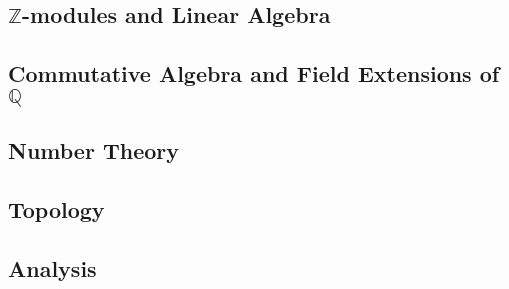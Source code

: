 \documentclass{article}
\newcommand{\nl}{\bigskip \\ } %
\newcommand{\Z}[0]{\mathbb{Z}}		%
\newcommand{\Q}[0]{\mathbb{Q}}		%
\theoremstyle{definition}
\theoremstyle{remark}
\begin{document}
\subsection{$\Z$-modules and Linear Algebra}
\subsection{Commutative Algebra and Field Extensions of $\Q$}
\subsection{Number Theory}
\subsection{Topology}
\subsection{Analysis}
\end{document}
